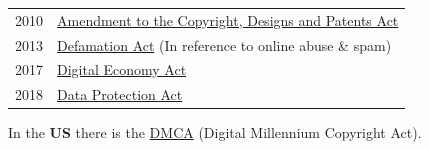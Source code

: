 \begin{center}
\begin{tabular}{l l}
        2010 & \href{https://www.legislation.gov.uk/uksi/2010/2694/contents/made}{Amendment to the Copyright, Designs and Patents Act}                                 \\
        2013 & \href{https://www.legislation.gov.uk/ukpga/2013/26/contents}{Defamation Act} (In reference to online abuse \& spam)                                     \\
        2017 & \href{https://www.legislation.gov.uk/ukpga/2017/30/contents}{Digital Economy Act}                                                                       \\
        2018 & \href{https://www.legislation.gov.uk/ukpga/2018/12/contents}{Data Protection Act}                                                                       \\
    \end{tabular}
\end{center}
In the \textbf{US} there is the \href{https://www.copyright.gov/dmca/}{DMCA} (Digital Millennium Copyright Act).
